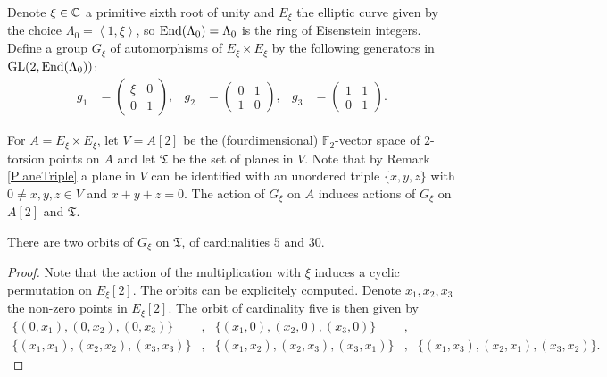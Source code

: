 \begin{definition}
Denote $\xi\in\mathbb{C}$ a primitive sixth root of unity and $E_\xi$ the elliptic curve given by the choice $\Lambda_0 = \left<1,\xi\right>$, so $\operatorname{End}(\Lambda_0)=\Lambda_0$ is the ring of Eisenstein integers. Define a group $G_\xi$ of automorphisms of $E_\xi\times E_\xi$ by the following generators in $\operatorname{GL}(2,\operatorname{End}(\Lambda_0))$:
\begin{align*}
g_1 &= \left( {\begin{array}{cc}
   \xi & 0 \\       0 & 1      
   \end{array} } \right),
 &
g_2 &= \left( {\begin{array}{cc}
   0 & 1 \\       1 & 0      
   \end{array} } \right),
 &
g_3 &= \left( {\begin{array}{cc}
   1 & 1 \\       0 & 1     
   \end{array} } \right).
\end{align*}
\end{definition}
For $A=E_\xi\times E_\xi$, let $V =A[2]$ be the (fourdimensional) $\mathbb F_2$-vector space of $2$-torsion points on $A$ and let $\mathfrak T$ be the set of planes in $V$. Note that by Remark \ref{PlaneTriple} a plane in $V$ can be identified with an unordered triple $\{x,y,z\}$ with $0\neq x,y,z\in V$ and $x+y+z=0$. The action of $G_\xi$ on $A$ induces actions of $G_\xi$ on $A[2]$ and $\mathfrak T$. 
\begin{proposition}\label{orbitesG}
There are two orbits of $G_\xi$ on $\mathfrak T$, of cardinalities $5$ and $30$.
\end{proposition}
\begin{proof}
Note that the action of the multiplication with $\xi$ induces a cyclic permutation on $E_\xi[2]$. The orbits can be explicitely computed.
Denote $x_1,x_2,x_3$ the non-zero points in $E_\xi[2]$. The orbit of cardinality five is then given by
\begin{align*}
\{(0,x_1),(0,x_2),(0,x_3)\} &,& \{(x_1,0),(x_2,0),(x_3,0)\} &,& \\
\{(x_1,x_1),(x_2,x_2),(x_3,x_3)\} &,& \{(x_1,x_2),(x_2,x_3),(x_3,x_1)\} &,& \{(x_1,x_3),(x_2,x_1),(x_3,x_2)\}.
\end{align*}
\end{proof}

